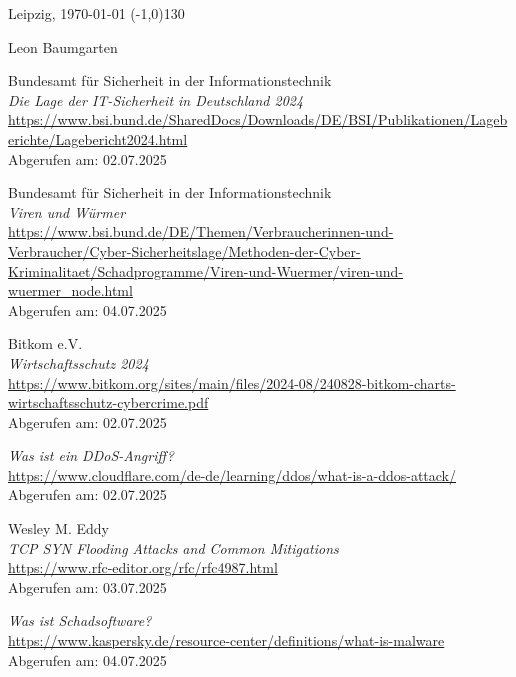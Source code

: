 \documentclass[12pt]{scrreprt}
\begin{document}
	Leipzig, \today \hspace{6cm} \line(-1,0){130}
	\begin{center}
		\hspace{5mm} {\footnotesize Leon Baumgarten}
	\end{center}
	
	\newpage
	\begin{thebibliography}{99} %
		
Bundesamt für Sicherheit in der Informationstechnik\\
\emph{Die Lage der IT-Sicherheit in Deutschland 2024} \\
\url{https://www.bsi.bund.de/SharedDocs/Downloads/DE/BSI/Publikationen/Lageberichte/Lagebericht2024.html}\\
Abgerufen am: 02.07.2025
		
Bundesamt für Sicherheit in der Informationstechnik\\
\emph{Viren und Würmer} \\
\url{https://www.bsi.bund.de/DE/Themen/Verbraucherinnen-und-Verbraucher/Cyber-Sicherheitslage/Methoden-der-Cyber-Kriminalitaet/Schadprogramme/Viren-und-Wuermer/viren-und-wuermer_node.html}\\
Abgerufen am: 04.07.2025
	
Bitkom e.V.\\
\emph{Wirtschaftsschutz 2024} \\
\url{https://www.bitkom.org/sites/main/files/2024-08/240828-bitkom-charts-wirtschaftsschutz-cybercrime.pdf}\\
Abgerufen am: 02.07.2025

\emph{Was ist ein DDoS-Angriff?} \\
\url{https://www.cloudflare.com/de-de/learning/ddos/what-is-a-ddos-attack/} \\
Abgerufen am: 02.07.2025

Wesley M. Eddy\\
\emph{TCP SYN Flooding Attacks and Common Mitigations} \\
\url{https://www.rfc-editor.org/rfc/rfc4987.html} \\
Abgerufen am: 03.07.2025

\emph{Was ist Schadsoftware?} \\
\url{https://www.kaspersky.de/resource-center/definitions/what-is-malware}\\
Abgerufen am: 04.07.2025


\end{thebibliography}
\end{document}
